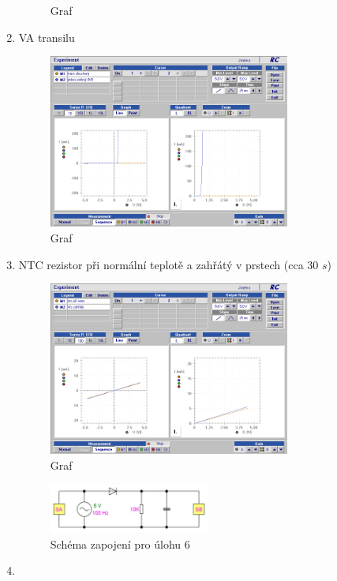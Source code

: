 \documentclass[a4paper]{article}
\begin{document}
\begin{enumerate}
\begin{figure}[H]
		\caption{Graf}
		\label{fig:mesh3}
	\end{figure}
	\item VA transilu
	\begin{figure}[H]
		\centering
		\includegraphics[width=0.75\textwidth]{12leden/4.png}
		\caption{Graf}
		\label{fig:mesh4}
	\end{figure}
	\item NTC rezistor při normální teplotě a zahřátý v prstech (cca 30 $s$)
	\begin{figure}[H]
		\centering
		\includegraphics[width=0.75\textwidth]{12leden/5.png}
		\caption{Graf}
		\label{fig:mesh5}
	\end{figure}
	\begin{figure}[H]
		\centering
		\includegraphics[width=0.5\textwidth]{zapojeni2.png}
		\caption{Schéma zapojení pro úlohu 6}
		\label{fig:mesh6}
	\end{figure}
	\item\begin{enumerate}

\end{enumerate}
\end{enumerate}
\end{document}

